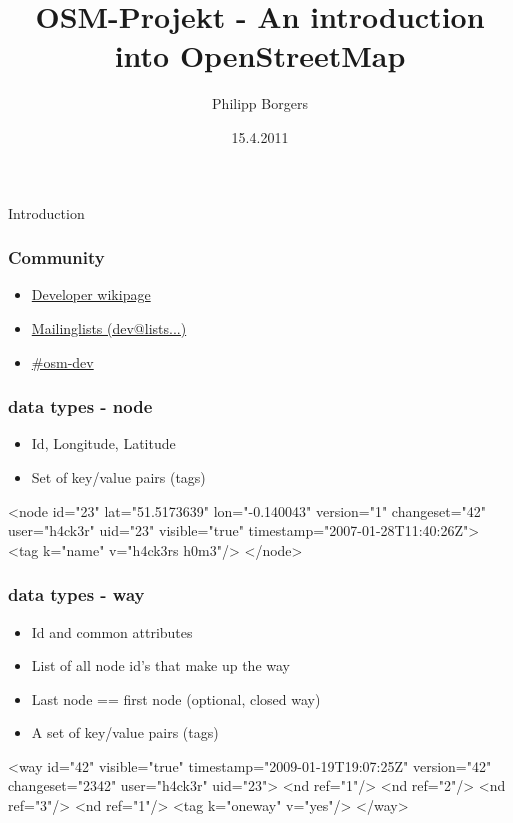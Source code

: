 \documentclass{beamer}
\title[OSM-Projekt - What is...]{OSM-Projekt - An introduction into OpenStreetMap}
\author{Philipp Borgers}
\institute{Institute for Computer Science, Free University Berlin}
\date{15.4.2011}
\begin{document}
\begin{frame}
\titlepage
\end{frame}

\begin{frame}{Introduction}
\end{frame}

\begin{frame}[fragile]
    \frametitle{Community}
    \begin{itemize}
        \item \href{http://wiki.openstreetmap.org/wiki/Develop}{Developer wikipage}
        \item \href{http://lists.openstreetmap.org/listinfo}{Mailinglists (dev@lists...)}
        \item \href{irc://irc.oftc.net/#osm-dev}{\#osm-dev}
    \end{itemize}
\end{frame}

\begin{frame}[fragile]
    \frametitle{data types - node}
    \begin{itemize}
    \item Id, Longitude, Latitude
    \item Set of key/value pairs (tags)
    \end{itemize}
    \begin{xmlcode}
    <node id="23" lat="51.5173639" lon="-0.140043" version="1" changeset="42" user="h4ck3r" 
        uid="23" visible="true" timestamp="2007-01-28T11:40:26Z">
       <tag k="name" v="h4ck3rs h0m3"/>
    </node>
    \end{xmlcode}
\end{frame}

\begin{frame}[fragile]
    \frametitle{data types - way}
    \begin{itemize}
    \item Id and common attributes
    \item List of all node id's that make up the way
    \item Last node == first node (optional, closed way)
    \item A set of key/value pairs (tags)
    \end{itemize}
    \begin{xmlcode}
    <way id="42" visible="true" timestamp="2009-01-19T19:07:25Z" version="42" changeset="2342"
        user="h4ck3r" uid="23">
        <nd ref="1"/>
        <nd ref="2"/>
        <nd ref="3"/>
        <nd ref="1"/>
        <tag k="oneway" v="yes"/>
    </way>
    \end{xmlcode}
\end{frame}
\end{document}
